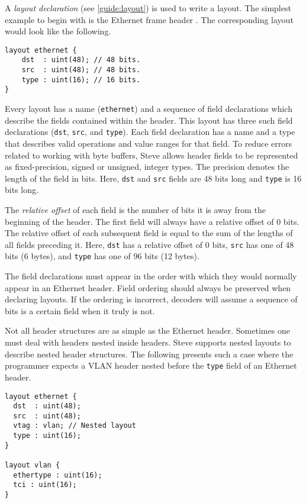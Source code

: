 A \emph{layout declaration} (see \ref{guide:layout}) is used to write a layout.
The simplest example to begin with is the Ethernet frame header \cite{eth_std}.
The corresponding layout would look like the following.  

\begin{codepage}
\begin{lstlisting}
layout ethernet {
	dst  : uint(48); // 48 bits.
	src  : uint(48); // 48 bits.
	type : uint(16); // 16 bits.
}
\end{lstlisting}
\end{codepage}

Every layout has a name (\texttt{ethernet}) and a sequence of field declarations
which describe the fields contained within the header.
This layout has three such field declarations (\texttt{dst}, \texttt{src},
and \texttt{type}).
Each field declaration has a name and a type that describes valid operations and
value ranges for that field.
To reduce errors related to working with byte buffers, Steve allows header fields to
be represented as fixed-precision, signed or unsigned, integer types.
The precision denotes the length of the field in bits.
Here, \texttt{dst} and \texttt{src} fields are 48 bits long and \texttt{type} is
16 bits long.

The \textit{relative offset} of each field is the number of bits it is away
from the beginning of the header. The first field will always have a relative
offset of 0 bits. The relative offset of each subsequent field is equal to the
sum of the lengths of all fields preceding it. Here, \texttt{dst} has a relative
offset of 0 bits, \texttt{src} has one of 48 bits (6 bytes), and \texttt{type} has one of
96 bits (12 bytes).

The field declarations must appear in the order with which they would normally appear
in an Ethernet header. Field ordering should always be
preserved when declaring layouts. If the ordering is incorrect, decoders will
assume a sequence of bits is a certain field when it truly is not. 

Not all header structures are as simple as the Ethernet header. Sometimes one
must deal with headers nested inside headers. Steve supports nested layouts
to describe nested header structures.
The following presents such a case where the programmer expects a VLAN header
\cite{vlan_std} nested before the \texttt{type} field of an Ethernet
header.

\begin{codepage}
\begin{lstlisting}
layout ethernet {
  dst  : uint(48);
  src  : uint(48);
  vtag : vlan; // Nested layout
  type : uint(16);
}

layout vlan {
  ethertype : uint(16);
  tci : uint(16);
}
\end{lstlisting}
\end{codepage}

